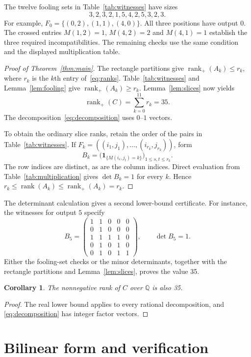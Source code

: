 \documentclass[11pt,a4paper]{article}
\newtheorem{corollary}[theorem]{Corollary}
\theoremstyle{definition}
\DeclareMathOperator{\rank}{rank}
\newcommand{\Q}{\mathbb Q}
\newcommand{\ind}{\mathbf 1}
\begin{document}
The twelve fooling sets in Table~\ref{tab:witnesses} have sizes
\[
 3,2,3,2,1,5,4,2,5,3,2,3.
\]
For example, $F_0=\{(0,2),(1,1),(4,0)\}$. All three positions have output
$0$. The crossed entries $M(1,2)=1$, $M(4,2)=2$ and $M(4,1)=1$ establish
the three required incompatibilities. The remaining checks use the
same condition and the displayed multiplication table.

\begin{proof}[Proof of Theorem~\ref{thm:main}]
The rectangle partitions give $\rank_+(A_k)\leq r_k$, where $r_k$ is the
$k$th entry of~\eqref{eq:ranks}. Table~\ref{tab:witnesses} and
Lemma~\ref{lem:fooling} give $\rank_+(A_k)\geq r_k$.
Lemma~\ref{lem:slices} now yields
\[
 \rank_+(C)=\sum_{k=0}^{11}r_k=35.
\]
The decomposition~\eqref{eq:decomposition} uses $0$--$1$ vectors.

To obtain the ordinary slice ranks, retain the order of the pairs in
Table~\ref{tab:witnesses}. If $F_k=((i_1,j_1),\ldots,(i_{r_k},j_{r_k}))$,
form
\[
 B_k=\bigl(\ind_{\{M(i_s,j_t)=k\}}\bigr)_{1\leq s,t\leq r_k}.
\]
The row indices are distinct, as are the column indices. Direct evaluation
from Table~\ref{tab:multiplication} gives $\det B_k=1$ for every $k$.
Hence $r_k\leq\rank(A_k)\leq\rank_+(A_k)=r_k$.
\end{proof}

The determinant calculation gives a second lower-bound certificate. For
instance, the witnesses for output $5$ specify
\[
 B_5=\begin{pmatrix}
 1&1&0&0&0\\
 0&1&0&0&0\\
 1&1&1&1&0\\
 0&1&0&1&0\\
 0&1&0&1&1
 \end{pmatrix},\qquad \det B_5=1.
\]
Either the fooling-set checks or the minor determinants, together with
the rectangle partitions and Lemma~\ref{lem:slices}, proves the value 35.

\begin{corollary}\label{cor:rational}
The nonnegative rank of $C$ over $\Q$ is also 35.
\end{corollary}
\begin{proof}
The real lower bound applies to every rational decomposition, and
\eqref{eq:decomposition} has integer factor vectors.
\end{proof}

\section{Bilinear form and verification}
\end{document}
